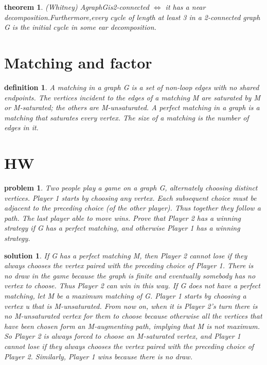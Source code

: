 \documentclass[twocolumn]{article}
\newtheorem{theorem}{theorem}[section]  %
\newtheorem{definition}{definition}
\newtheorem{problem}{problem}
\newtheorem{solution}{solution}
\begin{document}
\begin{CJK*}{UTF8}{bkai}
    \begin{theorem}{(Whitney)}
        AgraphGis2-connected $\iff$ it has a near decomposition.Furthermore,every
 cycle of length at least 3 in a 2-connected graph G is the initial cycle in some
 ear decomposition.
    \end{theorem}

\section{Matching and factor}
    \begin{definition}
        A matching in a graph G is a set of non-loop edges with no shared endpoints.
 The vertices incident to the edges of a matching M are saturated by M or
 M-saturated; the others are M-unsaturated. A perfect matching in a graph is
 a matching that saturates every vertex. The size of a matching is the number
 of edges in it.
    \end{definition}

\section{HW}

\begin{problem}
 Two people play a game on a graph G, alternately choosing distinct vertices. Player 1 starts by
 choosing any vertex. Each subsequent choice must be adjacent to the preceding choice (of the other
 player). Thus together they follow a path. The last player able to move wins.
 Prove that Player 2 has a winning strategy if G has a perfect matching, and otherwise Player 1 has
 a winning strategy.
\end{problem}

\begin{solution}
 If G has a perfect matching M, then Player 2 cannot lose if they always chooses the vertex paired
 with the preceding choice of Player 1. There is no draw in the game because the graph is finite and
 eventually somebody has no vertex to choose. Thus Player 2 can win in this way.
 If G does not have a perfect matching, let M be a maximum matching of G. Player 1 starts by
 choosing a vertex u that is M-unsaturated. From now on, when it is Player 2's turn there is no
 M-unsaturated vertex for them to choose because otherwise all the vertices that have been chosen
 form an M-augmenting path, implying that M is not maximum. So Player 2 is always forced to
 choose an M-saturated vertex, and Player 1 cannot lose if they always chooses the vertex paired
 with the preceding choice of Player 2. Similarly, Player 1 wins because there is no draw.
\end{solution}


\end{CJK*}
\end{document}

